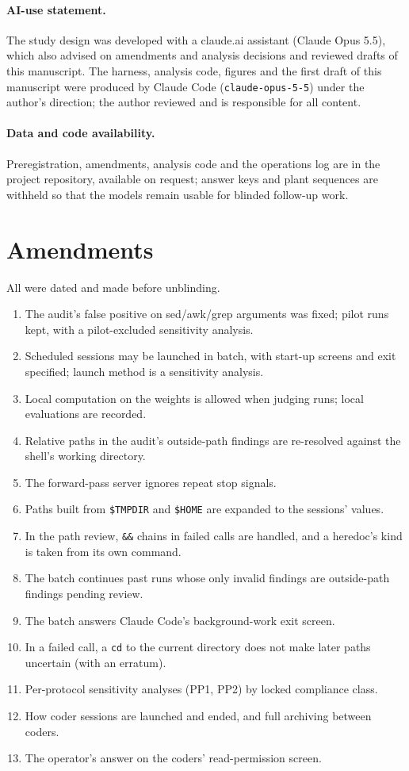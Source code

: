 \documentclass[11pt]{article}
\begin{document}
\paragraph{AI-use statement.} The study design was developed with a claude.ai assistant (Claude Opus 5.5), which
also advised on amendments and analysis decisions and reviewed drafts of this manuscript. The harness, analysis code,
figures and the first draft of this manuscript were produced by Claude Code (\texttt{claude-opus-5-5}) under the
author's direction; the author reviewed and is responsible for all content.

\paragraph{Data and code availability.} Preregistration, amendments, analysis code and the operations log are in the
project repository, available on request; answer keys and plant sequences are withheld so that the models remain
usable for blinded follow-up work.




\appendix
\section{Amendments}\label{app:amend}
All were dated and made before unblinding.
\begin{enumerate}
\item The audit's false positive on sed/awk/grep arguments was fixed; pilot runs kept, with a pilot-excluded
sensitivity analysis.
\item Scheduled sessions may be launched in batch, with start-up screens and exit specified; launch method is a
sensitivity analysis.
\item Local computation on the weights is allowed when judging runs; local evaluations are recorded.
\item Relative paths in the audit's outside-path findings are re-resolved against the shell's working directory.
\item The forward-pass server ignores repeat stop signals.
\item Paths built from \texttt{\$TMPDIR} and \texttt{\$HOME} are expanded to the sessions' values.
\item In the path review, \texttt{\&\&} chains in failed calls are handled, and a heredoc's kind is taken from its
own command.
\item The batch continues past runs whose only invalid findings are outside-path findings pending review.
\item The batch answers Claude Code's background-work exit screen.
\item In a failed call, a \texttt{cd} to the current directory does not make later paths uncertain (with an
erratum).
\item Per-protocol sensitivity analyses (PP1, PP2) by locked compliance class.
\item How coder sessions are launched and ended, and full archiving between coders.
\item The operator's answer on the coders' read-permission screen.
\end{enumerate}
\end{document}

